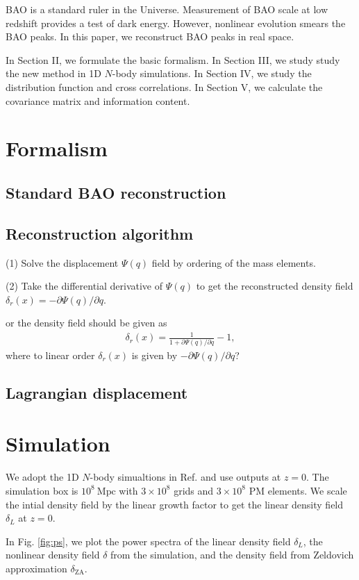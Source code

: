 \documentclass[aps,prd,twocolumn,showpacs,superscriptaddress,groupedaddress,nofootinbib]{revtex4}  %
\newcommand{\mr}{\mathrm}
\newcommand{\bea}{\begin{eqnarray}}
\newcommand{\eea}{\end{eqnarray}}
\begin{document}
BAO is a standard ruler in the Universe.
Measurement of BAO scale at low
redshift provides a test of dark energy. However, nonlinear evolution 
smears the BAO peaks.
In this paper, we reconstruct BAO peaks in real space.

In Section II, we formulate the basic formalism. In Section III,
we study study the new method in 1D $N$-body simulations. In Section IV,
we study the distribution function and cross correlations. In Section V, 
we calculate the covariance matrix and information content.

\section{Formalism}
\subsection{Standard BAO reconstruction}
\subsection{Reconstruction algorithm}
(1) Solve the displacement $\Psi(q)$ field by ordering of the mass elements.

(2) Take the differential derivative of $\Psi(q)$ to get the reconstructed
density field $\delta_r(x)=-\partial\Psi(q)/\partial q$.

or the density field should be given as
\bea
\delta_r(x)=\frac{1}{1+\partial\Psi(q)/\partial q} - 1,
\eea
where to linear order $\delta_r(x)$ is given by $-\partial\Psi(q)/\partial q$?

\subsection{Lagrangian displacement}



\section{Simulation}

We adopt the 1D $N$-body simualtions in Ref. \cite{2016matt}
and use outputs at $z=0$. The simulation box is $10^8\ \mr{Mpc}$ with 
$3\times10^8$ grids and $3\times10^8$ PM elements.
We scale the intial density field by the linear
growth factor to get the linear density field $\delta_L$ at $z=0$. 

In Fig. \ref{fig:ps}, we plot the power spectra of the linear density field
$\delta_{L}$, the nonlinear density field $\delta$ from the simulation,
and the density field from Zeldovich approximation $\delta_\mr{ZA}$.
\end{document}
